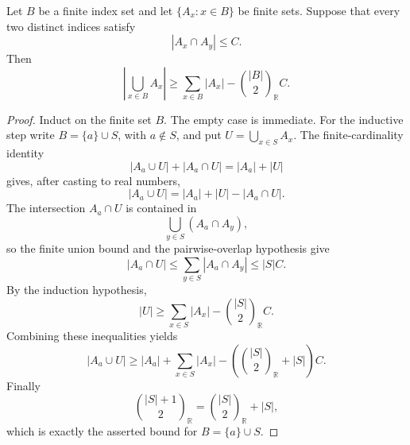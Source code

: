 \begin{helper}
Let \(B\) be a finite index set and let \(\{A_x:x\in B\}\) be finite sets.
Suppose that every two distinct indices satisfy
\[
|A_x\cap A_y|\le C.
\]
Then
\[
\left|\bigcup_{x\in B}A_x\right|
\ge
\sum_{x\in B}|A_x|-\binom{|B|}{2}_{\mathbb R}C.
\]
\end{helper}
\begin{proof}
Induct on the finite set \(B\).  The empty case is immediate.  For the
inductive step write \(B=\{a\}\cup S\), with \(a\notin S\), and put
\(U=\bigcup_{x\in S}A_x\).  The finite-cardinality identity
\[
|A_a\cup U|+|A_a\cap U|=|A_a|+|U|
\]
gives, after casting to real numbers,
\[
|A_a\cup U|=|A_a|+|U|-|A_a\cap U|.
\]
The intersection \(A_a\cap U\) is contained in
\[
\bigcup_{y\in S}(A_a\cap A_y),
\]
so the finite union bound and the pairwise-overlap hypothesis give
\[
|A_a\cap U|\le\sum_{y\in S}|A_a\cap A_y|\le |S|C.
\]
By the induction hypothesis,
\[
|U|\ge\sum_{x\in S}|A_x|-\binom{|S|}{2}_{\mathbb R}C.
\]
Combining these inequalities yields
\[
|A_a\cup U|
\ge |A_a|+\sum_{x\in S}|A_x|
  -\left(\binom{|S|}{2}_{\mathbb R}+|S|\right)C.
\]
Finally
\[
\binom{|S|+1}{2}_{\mathbb R}
=\binom{|S|}{2}_{\mathbb R}+|S|,
\]
which is exactly the asserted bound for \(B=\{a\}\cup S\).
\end{proof}
